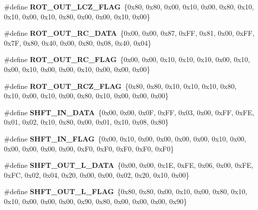 \begin{DoxyCompactItemize}
\#define {\bfseries R\+O\+T\+\_\+\+O\+U\+T\+\_\+\+L\+C\+Z\+\_\+\+F\+L\+AG}~\{0x80, 0x80, 0x00, 0x10, 0x00, 0x80, 0x10, 0x10, 0x00, 0x10, 0x80, 0x00, 0x00, 0x10, 0x00\}
\item 
\mbox{\label{unit-test-cpu-dispatch_8c_ad736c0d09f8fb61c43e71cef82323e72}} 
\#define {\bfseries R\+O\+T\+\_\+\+O\+U\+T\+\_\+\+R\+C\+\_\+\+D\+A\+TA}~\{0x00, 0x00, 0x87, 0x\+F\+F, 0x81, 0x00, 0x\+F\+F, 0x7\+F, 0x80, 0x40, 0x00, 0x80, 0x08, 0x40, 0x04\}
\item 
\mbox{\label{unit-test-cpu-dispatch_8c_aad91ad9949f9b186382357bbc68229f2}} 
\#define {\bfseries R\+O\+T\+\_\+\+O\+U\+T\+\_\+\+R\+C\+\_\+\+F\+L\+AG}~\{0x00, 0x00, 0x10, 0x10, 0x10, 0x00, 0x10, 0x00, 0x10, 0x00, 0x00, 0x10, 0x00, 0x00, 0x00\}
\item 
\mbox{\label{unit-test-cpu-dispatch_8c_a3f8a29a8f5e9ed9d75fcf116a9e3792c}} 
\#define {\bfseries R\+O\+T\+\_\+\+O\+U\+T\+\_\+\+R\+C\+Z\+\_\+\+F\+L\+AG}~\{0x80, 0x80, 0x10, 0x10, 0x10, 0x80, 0x10, 0x00, 0x10, 0x00, 0x80, 0x10, 0x00, 0x00, 0x00\}
\item 
\mbox{\label{unit-test-cpu-dispatch_8c_a79005785ae5b5ae4d849dbcddb5a5351}} 
\#define {\bfseries S\+H\+F\+T\+\_\+\+I\+N\+\_\+\+D\+A\+TA}~\{0x00, 0x00, 0x0\+F, 0x\+F\+F, 0x03, 0x00, 0x\+F\+F, 0x\+F\+E, 0x01, 0x02, 0x10, 0x80, 0x00, 0x01, 0x10, 0x08, 0x80\}
\item 
\mbox{\label{unit-test-cpu-dispatch_8c_ab5cf7e1dff7ff6b2b45617aa6fe0622b}} 
\#define {\bfseries S\+H\+F\+T\+\_\+\+I\+N\+\_\+\+F\+L\+AG}~\{0x00, 0x10, 0x00, 0x00, 0x00, 0x00, 0x10, 0x00, 0x00, 0x00, 0x00, 0x00, 0x\+F0, 0x\+F0, 0x\+F0, 0x\+F0, 0x\+F0\}
\item 
\mbox{\label{unit-test-cpu-dispatch_8c_a65614f35143d06e558652fd1aca8a607}} 
\#define {\bfseries S\+H\+F\+T\+\_\+\+O\+U\+T\+\_\+\+L\+\_\+\+D\+A\+TA}~\{0x00, 0x00, 0x1\+E, 0x\+F\+E, 0x06, 0x00, 0x\+F\+E, 0x\+F\+C, 0x02, 0x04, 0x20, 0x00, 0x00, 0x02, 0x20, 0x10, 0x00\}
\item 
\mbox{\label{unit-test-cpu-dispatch_8c_a63831dda47d505750c15e301ae22df93}} 
\#define {\bfseries S\+H\+F\+T\+\_\+\+O\+U\+T\+\_\+\+L\+\_\+\+F\+L\+AG}~\{0x80, 0x80, 0x00, 0x10, 0x00, 0x80, 0x10, 0x10, 0x00, 0x00, 0x00, 0x90, 0x80, 0x00, 0x00, 0x00, 0x90\}

\end{DoxyCompactItemize}
